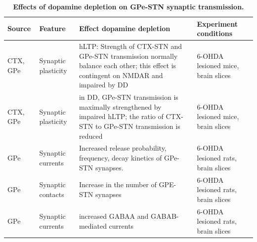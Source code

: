 %
\begin{table} %
\centering
\caption{{\bf Effects of dopamine depletion on GPe-STN synaptic transmission.}}
\begin{tabular}{p{0.06\textheight}p{0.15\textheight}p{0.35\textheight}p{0.35\textheight}}%
\toprule
Source & Feature & Effect dopamine depletion & Experiment conditions \\ \midrule
CTX, GPe & Synaptic plasticity & hLTP: Strength of CTX-STN and GPe-STN transmission normally balance each other; this effect is contingent on NMDAR and impaired by DD & 6-OHDA lesioned mice, brain slices \cite{chu_loss_2017,chu_heterosynaptic_2015} \\
CTX, GPe & Synaptic plasticity & in DD, GPe-STN transmission is maximally strengthened by impaired hLTP; the ratio of CTX-STN to GPe-STN transmission is reduced & 6-OHDA lesioned mice, brain slices \cite{chu_loss_2017,chu_heterosynaptic_2015} \\
GPe & Synaptic currents & Increased release probability, frequency, decay kinetics of GPe-STN synapses. & 6-OHDA lesioned rats, brain slices \cite{fan_proliferation_2012,baufreton_d2-like_2008,shen_presynaptic_2000} \\
GPe & Synaptic contacts & Increase in the number of GPE-STN synapses & 6-OHDA lesioned rats, brain slices \cite{fan_proliferation_2012,chu_loss_2017} \\
GPe & Synaptic currents & increased GABAA and GABAB-mediated currents & 6-OHDA lesioned rats, brain slices \cite{shen_dopamine_2005} \\
\bottomrule
\end{tabular}
\label{tab:dd-connectivy_stn-gpe}
\end{table} %

